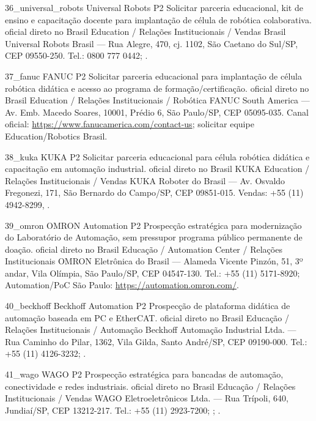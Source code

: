 \ContatoEmpresa
  {36_universal_robots}
  {Universal Robots}
  {P2}
  {Solicitar parceria educacional, kit de ensino e capacitação docente para implantação de célula de robótica colaborativa.}
  {oficial direto no Brasil}
  {Education / Relações Institucionais / Vendas Brasil}
  {Universal Robots Brasil — Rua Alegre, 470, cj. 1102, São Caetano do Sul/SP, CEP 09550-250. Tel.: 0800 777 0442; .}

\ContatoEmpresa
  {37_fanuc}
  {FANUC}
  {P2}
  {Solicitar parceria educacional para implantação de célula robótica didática e acesso ao programa de formação/certificação.}
  {oficial direto no Brasil}
  {Education / Relações Institucionais / Robótica}
  {FANUC South America — Av. Emb. Macedo Soares, 10001, Prédio 6, São Paulo/SP, CEP 05095-035. Canal oficial: \url{https://www.fanucamerica.com/contact-us}; solicitar equipe Education/Robotics Brasil.}

\ContatoEmpresa
  {38_kuka}
  {KUKA}
  {P2}
  {Solicitar parceria educacional para célula robótica didática e capacitação em automação industrial.}
  {oficial direto no Brasil}
  {KUKA Education / Relações Institucionais / Vendas}
  {KUKA Roboter do Brasil — Av. Osvaldo Fregonezi, 171, São Bernardo do Campo/SP, CEP 09851-015. Vendas: +55 (11) 4942-8299, .}

\ContatoEmpresa
  {39_omron}
  {OMRON Automation}
  {P2}
  {Prospecção estratégica para modernização do Laboratório de Automação, sem pressupor programa público permanente de doação.}
  {oficial direto no Brasil}
  {Educação / Automation Center / Relações Institucionais}
  {OMRON Eletrônica do Brasil — Alameda Vicente Pinzón, 51, 3º andar, Vila Olímpia, São Paulo/SP, CEP 04547-130. Tel.: +55 (11) 5171-8920; Automation/PoC São Paulo: \url{https://automation.omron.com/}.}

\ContatoEmpresa
  {40_beckhoff}
  {Beckhoff Automation}
  {P2}
  {Prospecção de plataforma didática de automação baseada em PC e EtherCAT.}
  {oficial direto no Brasil}
  {Educação / Relações Institucionais / Automação}
  {Beckhoff Automação Industrial Ltda. — Rua Caminho do Pilar, 1362, Vila Gilda, Santo André/SP, CEP 09190-000. Tel.: +55 (11) 4126-3232; .}

\ContatoEmpresa
  {41_wago}
  {WAGO}
  {P2}
  {Prospecção estratégica para bancadas de automação, conectividade e redes industriais.}
  {oficial direto no Brasil}
  {Educação / Relações Institucionais / Vendas}
  {WAGO Eletroeletrônicos Ltda. — Rua Trípoli, 640, Jundiaí/SP, CEP 13212-217. Tel.: +55 (11) 2923-7200; ; .}

